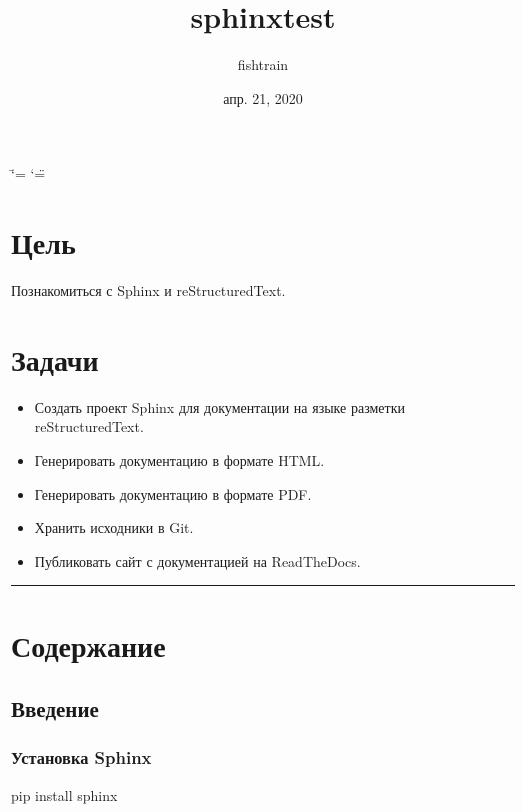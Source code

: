 \documentclass[letterpaper,12pt,russian]{sphinxmanual}
\title{sphinx\sphinxhyphen{}test}
\date{апр. 21, 2020}
\author{fish\sphinxhyphen{}train}
\begin{document}
\ifdefined\shorthandoff
  \ifnum\catcode`\=\string=\active\shorthandoff{=}\fi
  \ifnum\catcode`\"=\active{}\fi
\fi

\pagestyle{empty}
\sphinxmaketitle
\pagestyle{plain}
\sphinxtableofcontents
\pagestyle{normal}
\label{\detokenize{index::doc}}



\chapter{Цель}
\label{\detokenize{index:id1}}
Познакомиться с Sphinx и reStructuredText.


\chapter{Задачи}
\label{\detokenize{index:id2}}\begin{itemize}
\item {} 
Создать проект Sphinx для документации на языке разметки reStructuredText.

\item {} 
Генерировать документацию в формате HTML.

\item {} 
Генерировать документацию в формате PDF.

\item {} 
Хранить исходники в Git.

\item {} 
Публиковать сайт с документацией на ReadTheDocs.

\end{itemize}


\bigskip\hrule\bigskip



\chapter{Содержание}
\label{\detokenize{index:id3}}

\section{Введение}
\label{\detokenize{start:id1}}\label{\detokenize{start::doc}}

\subsection{Установка Sphinx}
\label{\detokenize{start:sphinx}}
\begin{sphinxVerbatim}[commandchars=\\\{\}]
pip install sphinx
\end{sphinxVerbatim}
\end{document}
